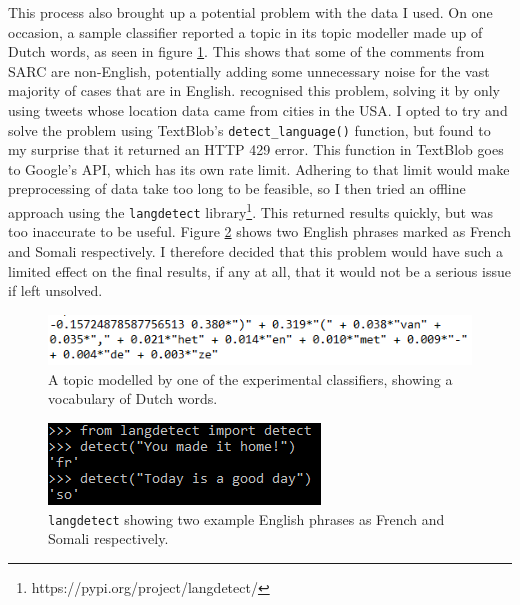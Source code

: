 \documentclass[a4paper,12pt]{article}
\begin{document}
This process also brought up a potential problem with the data I used. On one occasion, a sample classifier reported a topic in its topic modeller made up of Dutch words, as seen in figure \ref{fig:dutch}. This shows that some of the comments from SARC are non-English, potentially adding some unnecessary noise for the vast majority of cases that are in English. \cite{clicheSarcasmDetector2014} recognised this problem, solving it by only using tweets whose location data came from cities in the USA. I opted to try and solve the problem using TextBlob's \texttt{detect\_language()} function, but found to my surprise that it returned an HTTP 429 error. This function in TextBlob goes to Google's API, which has its own rate limit. Adhering to that limit would make preprocessing of data take too long to be feasible, so I then tried an offline approach using the \texttt{langdetect} library\footnote{https://pypi.org/project/langdetect/}. This returned results quickly, but was too inaccurate to be useful. Figure \ref{fig:lang} shows two English phrases marked as French and Somali respectively. I therefore decided that this problem would have such a limited effect on the final results, if any at all, that it would not be a serious issue if left unsolved.

\begin{figure}[h!]
\includegraphics[width=\linewidth]{Figures/topic_example.png}
\caption{A topic modelled by one of the experimental classifiers, showing a vocabulary of Dutch words.}
\label{fig:dutch}
\end{figure}

\begin{figure}[h!]
\includegraphics[width=\linewidth]{Figures/language_inaccurate.png}
\caption{\texttt{langdetect} showing two example English phrases as French and Somali respectively.}
\label{fig:lang}
\end{figure}
\end{document}

